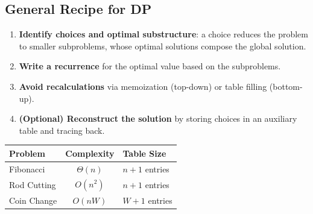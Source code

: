 \subsection{General Recipe for DP}

\begin{tcolorbox}[colback=lightblue, colframe=keyblue,
                  title={\textbf{Design Steps for a DP Algorithm}},
                  fonttitle=\bfseries]
\begin{enumerate}
  \item \textbf{Identify choices and optimal substructure}: a choice reduces
        the problem to smaller subproblems, whose optimal solutions
        compose the global solution.
  \item \textbf{Write a recurrence} for the optimal value based on the
        subproblems.
  \item \textbf{Avoid recalculations} via memoization (top-down) or table filling
        (bottom-up).
  \item \textbf{(Optional) Reconstruct the solution} by storing choices in an
        auxiliary table and tracing back.
\end{enumerate}
\end{tcolorbox}

\begin{center}
\renewcommand{\arraystretch}{1.35}
\begin{tabular}{lcl}
\toprule
\textbf{Problem} & \textbf{Complexity} & \textbf{Table Size} \\
\midrule
Fibonacci         & $\Theta(n)$   & $n+1$ entries \\
Rod Cutting       & $O(n^2)$      & $n+1$ entries \\
Coin Change       & $O(nW)$       & $W+1$ entries \\
\bottomrule
\end{tabular}
\end{center}